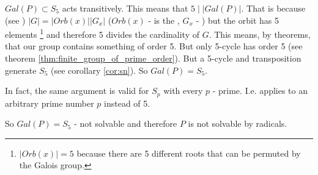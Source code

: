 \begin{example}
\begin{enumerate}
      $Gal\left(P\right) \subset S_5$ acts transitively. This means
      that $5 \mid \left|Gal\left(P\right)\right|$. That is because
      (see )
      $\left|G\right| = \left|Orb\left(x\right)\right| \left|G_x\right|$
      ($Orb\left(x\right)$ - is the ,
      $G_x$ - )
      but the orbit has 5 elements
      \footnote{
        $\left|Orb\left(x\right)\right| = 5$ because there are 5
        different roots that can be permuted by the Galois group.
      }
      and therefore 5 divides
      the cardinality of $G$. This means, by  
      theorems, that our group contains something of order 5. But only
      5-cycle has order 5 (see theorem
      \ref{thm:finite_group_of_prime_order}). 
      But a 5-cycle and transposition generate
      $S_5$ (see corollary \ref{cor:sn}).
      So $Gal\left(P\right) = S_5$.
  \end{enumerate}
  In fact, the same argument is valid for $S_p$ with every $p$ - prime. 
  I.e. applies to an arbitrary prime number $p$ instead of 5.

  So $Gal\left(P\right) = S_5$ - not solvable and therefore $P$ is not
  solvable by radicals.
  \label{ex:lec8_notsolvable1}
\end{example}

